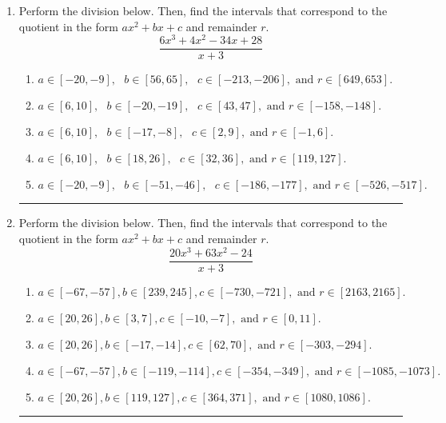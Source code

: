 \documentclass[14pt]{extbook}
\newcommand{\litem}[1]{\item#1\hspace*{-1cm}\rule{\textwidth}{0.4pt}}
\begin{document}
\begin{enumerate}
{\begin{enumerate}[label=\Alph*.]
\end{enumerate} }
\litem{
Perform the division below. Then, find the intervals that correspond to the quotient in the form $ax^2+bx+c$ and remainder $r$.\[ \frac{6x^{3} +4 x^{2} -34 x + 28}{x + 3} \]\begin{enumerate}[label=\Alph*.]
\item \( a \in [-20, -9], \text{   } b \in [56, 65], \text{   } c \in [-213, -206], \text{   and   } r \in [649, 653]. \)
\item \( a \in [6, 10], \text{   } b \in [-20, -19], \text{   } c \in [43, 47], \text{   and   } r \in [-158, -148]. \)
\item \( a \in [6, 10], \text{   } b \in [-17, -8], \text{   } c \in [2, 9], \text{   and   } r \in [-1, 6]. \)
\item \( a \in [6, 10], \text{   } b \in [18, 26], \text{   } c \in [32, 36], \text{   and   } r \in [119, 127]. \)
\item \( a \in [-20, -9], \text{   } b \in [-51, -46], \text{   } c \in [-186, -177], \text{   and   } r \in [-526, -517]. \)

\end{enumerate} }
\litem{
Perform the division below. Then, find the intervals that correspond to the quotient in the form $ax^2+bx+c$ and remainder $r$.\[ \frac{20x^{3} +63 x^{2} -24}{x + 3} \]\begin{enumerate}[label=\Alph*.]
\item \( a \in [-67, -57], b \in [239, 245], c \in [-730, -721], \text{ and } r \in [2163, 2165]. \)
\item \( a \in [20, 26], b \in [3, 7], c \in [-10, -7], \text{ and } r \in [0, 11]. \)
\item \( a \in [20, 26], b \in [-17, -14], c \in [62, 70], \text{ and } r \in [-303, -294]. \)
\item \( a \in [-67, -57], b \in [-119, -114], c \in [-354, -349], \text{ and } r \in [-1085, -1073]. \)
\item \( a \in [20, 26], b \in [119, 127], c \in [364, 371], \text{ and } r \in [1080, 1086]. \)


\end{enumerate}}
\end{enumerate}
\end{document}
